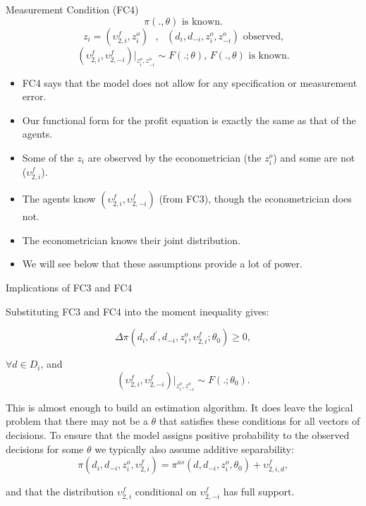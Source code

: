 \documentclass[aspectratio=169,11pt]{beamer}
\begin{document}
\begin{frame}{Measurement Condition (FC4)}
\begin{equation*}
\pi (.,\theta )\text{ is known.}
\end{equation*}%
\begin{equation*}
z_{i}=(\upsilon _{2,i}^{f},z_{i}^{o})\text{ },\text{ }%
(d_{i},d_{-i},z_{i}^{o},z_{-i}^{o})\text{ observed,}
\end{equation*}%
\begin{equation*}
(\upsilon _{2,i}^{f},\upsilon _{2,-i}^{f})|_{z_{i}^{o},z_{-i}^{o}}\sim
F(.;\theta )\text{, }F(.,\theta )\text{ is known.}
\end{equation*}
\begin{itemize}
\item FC4 says that the model does not allow for any specification or measurement
error. 
\item Our functional form for the profit equation is exactly the
same as that of the agents.
\item Some of the $z_{i}$ are observed by the
econometrician (the $z_{i}^{o}$) and some are not ($\upsilon _{2,i}^{f}$).
\item The agents know $(\upsilon _{2,i}^{f},\upsilon _{2,-i}^{f})$ (from FC3), though the
econometrician does not.
\item The econometrician knows their joint distribution.
\item  We will see below that these assumptions provide a lot of power.
\end{itemize}
\end{frame}


\begin{frame}{Implications of FC3 and FC4}

Substituting FC3 and FC4 into the moment inequality gives:

\begin{equation*}
\Delta \pi (d_{i},d^{\prime },d_{-i},z_{i}^{o},\upsilon _{2,i}^{f};\theta
_{0})\geq 0,
\end{equation*}

$\forall d\in D_{i}$, and%
\begin{equation*}
(\upsilon _{2,i}^{f},\upsilon _{2,-i}^{f})|_{z_{i}^{o},z_{-i}^{o}}\sim
F(.;\theta _{0}).
\end{equation*}

This is almost enough to build an estimation algorithm. It does leave the
logical problem that there may not be a $\theta $ that satisfies these
conditions for all vectors of decisions. To ensure that the model assigns
positive probability to the observed decisions for some $\theta $ we
typically also assume additive separability:%
\begin{equation*}
\pi (d_{i},d_{-i},z_{i}^{o},\upsilon _{2,i}^{f})=\pi
^{as}(d,d_{-i},z_{i}^{o},\theta _{0})+\upsilon _{2,i,d}^{f},
\end{equation*}

and that the distribution $\upsilon _{2,i}^{f}$ conditional on $\upsilon
_{2,-i}^{f}$ has full support.
\end{frame}
\end{document}
